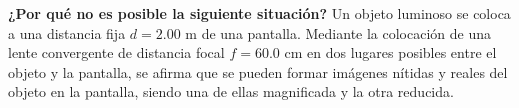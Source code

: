\item \textbf{¿Por qué no es posible la siguiente situación?}
Un objeto luminoso se coloca a una distancia fija $d = 2.00\text{ m}$ de una pantalla. Mediante la colocación de una lente convergente de distancia focal $f = 60.0\text{ cm}$ en dos lugares posibles entre el objeto y la pantalla, se afirma que se pueden formar imágenes nítidas y reales del objeto en la pantalla, siendo una de ellas magnificada y la otra reducida.